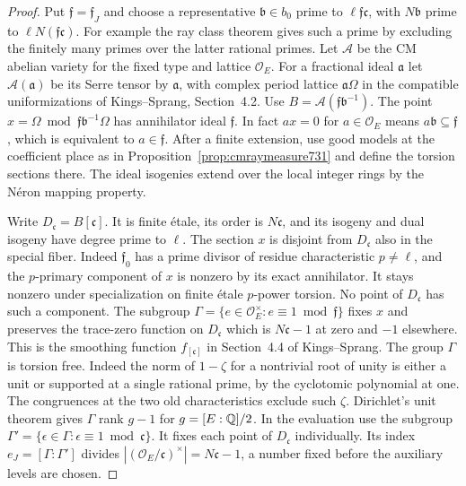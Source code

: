\documentclass[a4paper,11pt]{article}
\theoremstyle{definition}
\theoremstyle{remark}
\numberwithin{equation}{section}
\begin{document}
\begin{proof}
Put \(\mathfrak f=\mathfrak f_J\) and choose a representative
\(\mathfrak b\in b_0\) prime to \(\ell\mathfrak f\mathfrak c\),
with \(N\mathfrak b\) prime to \(\ell N(\mathfrak f\mathfrak c)\).
For example the ray class theorem gives such a prime by excluding
the finitely many primes over the latter rational primes.
Let \(\mathcal A\) be the CM abelian variety for the fixed type
and lattice \(\mathcal O_E\). For a fractional ideal
\(\mathfrak a\) let \(\mathcal A(\mathfrak a)\) be its Serre tensor
by \(\mathfrak a\), with complex period lattice \(\mathfrak a\Omega\)
in the compatible uniformizations of Kings--Sprang, Section~4.2.
Use \(B=\mathcal A(\mathfrak f\mathfrak b^{-1})\). The point
\(x=\Omega\bmod\mathfrak f\mathfrak b^{-1}\Omega\) has annihilator
ideal \(\mathfrak f\). In fact \(a x=0\) for \(a\in\mathcal O_E\)
means \(a\mathfrak b\subseteq\mathfrak f\), which is equivalent
to \(a\in\mathfrak f\). After a finite extension, use good models
at the coefficient place as in Proposition~\ref{prop:cmraymeasure731}
and define the torsion sections there. The ideal isogenies extend
over the local integer rings by the Néron mapping property.

Write \(D_{\mathfrak c}=B[\mathfrak c]\). It is finite étale, its
order is \(N\mathfrak c\), and its isogeny and dual isogeny have
degree prime to \(\ell\). The section \(x\) is disjoint from
\(D_{\mathfrak c}\) also in the special fiber. Indeed
\(\mathfrak f_0\) has a prime divisor of residue characteristic
\(p\ne\ell\), and the \(p\)-primary component of \(x\) is nonzero
by its exact annihilator. It stays nonzero under specialization on
finite étale \(p\)-power torsion. No point of \(D_{\mathfrak c}\)
has such a component. The subgroup
\(\Gamma=\{e\in\mathcal O_E^\times:e\equiv1\bmod\mathfrak f\}\)
fixes \(x\) and preserves the trace-zero function on \(D_{\mathfrak c}\)
which is \(N\mathfrak c-1\) at zero and \(-1\) elsewhere.
This is the smoothing function \(f_{[\mathfrak c]}\) in Section~4.4
of Kings--Sprang. The group \(\Gamma\) is torsion free. Indeed the
norm of \(1-\zeta\) for a nontrivial root of unity is either a unit
or supported at a single rational prime, by the cyclotomic polynomial
at one. The congruences at the two old characteristics exclude
such \(\zeta\). Dirichlet's unit theorem gives \(\Gamma\) rank
\(g-1\) for \(g=[E:\mathbb Q]/2\). In the evaluation use the subgroup
\(\Gamma'=\{\epsilon\in\Gamma:\epsilon\equiv1\bmod\mathfrak c\}\).
It fixes each point of \(D_{\mathfrak c}\) individually.
Its index \(e_J=[\Gamma:\Gamma']\) divides
\(|(\mathcal O_E/\mathfrak c)^\times|=N\mathfrak c-1\), a number
fixed before the auxiliary levels are chosen.


\end{proof}
\end{document}
